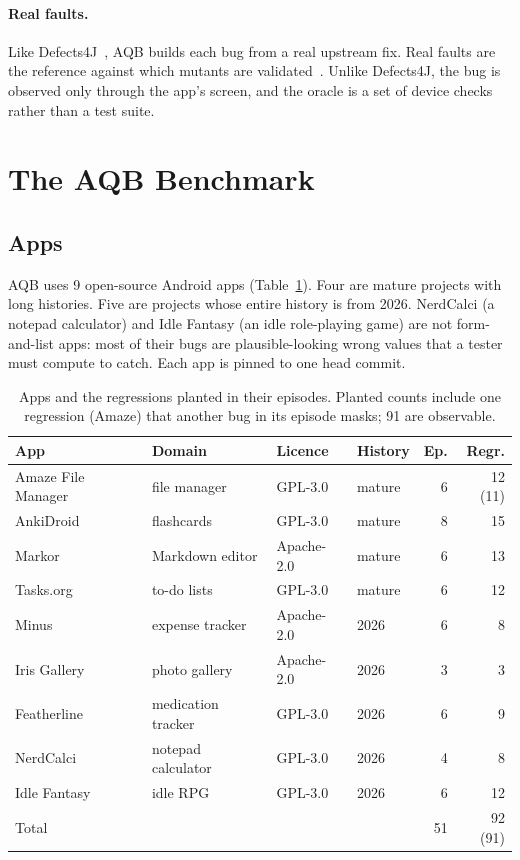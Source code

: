 \documentclass[sigconf]{acmart}
\newcommand{\aqb}{AQB\xspace}
\begin{document}
\paragraph{Real faults.}
Like Defects4J~\cite{just2014defects4j}, \aqb builds each bug from a real upstream fix. Real faults
are the reference against which mutants are validated~\cite{just2014mutants}. Unlike Defects4J, the
bug is observed only through the app's screen, and the oracle is a set of device checks rather than
a test suite.

\section{The AQB Benchmark}
\label{sec:benchmark}

\subsection{Apps}
\aqb uses 9 open-source Android apps (Table~\ref{tab:apps}). Four are mature projects with long
histories. Five are projects whose entire history is from 2026. NerdCalci (a notepad calculator) and
Idle Fantasy (an idle role-playing game) are not form-and-list apps: most of their bugs are
plausible-looking wrong values that a tester must compute to catch. Each app is pinned to one head
commit.

\begin{table}[t]
  \caption{Apps and the regressions planted in their episodes. Planted counts include one
  regression (Amaze) that another bug in its episode masks; 91 are observable.}
  \label{tab:apps}
  \footnotesize\setlength{\tabcolsep}{3.5pt}
  \begin{tabular}{@{}llllrr@{}}
    \toprule
    App & Domain & Licence & History & Ep. & Regr. \\
    \midrule
    Amaze File Manager & file manager & GPL-3.0 & mature & 6 & 12 (11) \\
    AnkiDroid & flashcards & GPL-3.0 & mature & 8 & 15 \\
    Markor & Markdown editor & Apache-2.0 & mature & 6 & 13 \\
    Tasks.org & to-do lists & GPL-3.0 & mature & 6 & 12 \\
    Minus & expense tracker & Apache-2.0 & 2026 & 6 & 8 \\
    Iris Gallery & photo gallery & Apache-2.0 & 2026 & 3 & 3 \\
    Featherline & medication tracker & GPL-3.0 & 2026 & 6 & 9 \\
    NerdCalci & notepad calculator & GPL-3.0 & 2026 & 4 & 8 \\
    Idle Fantasy & idle RPG & GPL-3.0 & 2026 & 6 & 12 \\
    \midrule
    Total & & & & 51 & 92 (91) \\
    \bottomrule
  \end{tabular}
\end{table}
\end{document}
